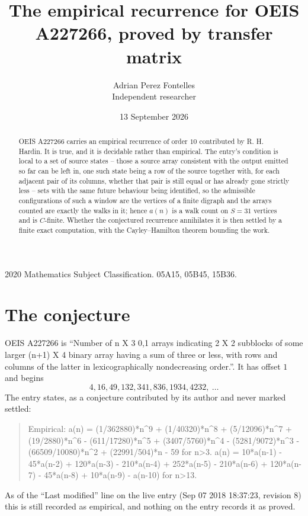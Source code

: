 \documentclass[11pt,a4paper]{article}
\title{The empirical recurrence for OEIS A227266, proved by transfer matrix}
\author{Adrian Perez Fontelles\\ \small Independent researcher}
\date{13 September 2026}
\theoremstyle{plain}
\theoremstyle{definition}
\begin{document}
\maketitle

\begin{abstract}
OEIS A227266 carries an empirical recurrence of order $10$ contributed by R. H. Hardin. It is
true, and it is decidable rather than empirical. The entry's condition is local to a set of source states -- those a source array consistent with the output emitted so far can be left in, one such state being a row of the source together with, for each adjacent pair of its columns, whether that pair is still equal or has already gone strictly less -- sets with the same future behaviour being identified, so
the admissible configurations of such a window are the vertices of a finite digraph and the
arrays counted are exactly the walks in it; hence $a(n)$ is a walk count on $S=31$ vertices
and is $C$-finite. Whether the conjectured recurrence annihilates it is then settled by a
finite exact computation, with the Cayley--Hamilton theorem bounding the work.
\end{abstract}

\noindent\small 2020 Mathematics Subject Classification. 05A15, 05B45, 15B36.\normalsize

\section{The conjecture}

OEIS A227266 is ``Number of n X 3 0,1 arrays indicating 2 X 2 subblocks of some larger (n+1) X 4 binary array having a sum of three or less, with rows and columns of the latter in lexicographically nondecreasing order.''. It has offset $1$ and begins
\[
4, 16, 49, 132, 341, 836, 1934, 4232,\ \dots
\]
The entry states, as a conjecture contributed by its author and never marked settled:
\begin{quote}
Empirical: a(n) = (1/362880)*n\^{}9 + (1/40320)*n\^{}8 + (5/12096)*n\^{}7 + (19/2880)*n\^{}6 - (611/17280)*n\^{}5 + (3407/5760)*n\^{}4 - (5281/9072)*n\^{}3 - (66509/10080)*n\^{}2 + (22991/504)*n - 59 for n>3. a(n) = 10*a(n-1) - 45*a(n-2) + 120*a(n-3) - 210*a(n-4) + 252*a(n-5) - 210*a(n-6) + 120*a(n-7) - 45*a(n-8) + 10*a(n-9) - a(n-10) for n>13.
\end{quote}
As of the ``Last modified'' line on the live entry (Sep 07 2018 18:37:23, revision 8) this is still
recorded as empirical, and nothing on the entry records it as proved.
\end{document}
